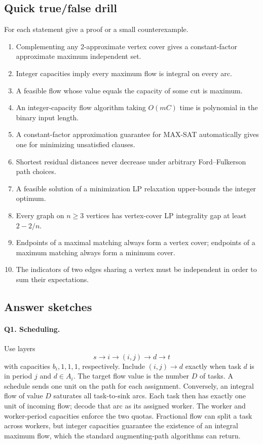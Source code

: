 \subsection{Quick true/false drill}
For each statement give a proof or a small counterexample.
\begin{enumerate}[label=\textbf{T\arabic*.}]
  \item Complementing any 2-approximate vertex cover gives a constant-factor
        approximate maximum independent set.
  \item Integer capacities imply every maximum flow is integral on every arc.
  \item A feasible flow whose value equals the capacity of some cut is maximum.
  \item An integer-capacity flow algorithm taking $O(mC)$ time is polynomial
        in the binary input length.
  \item A constant-factor approximation guarantee for MAX-SAT automatically
        gives one for minimizing unsatisfied clauses.
  \item Shortest residual distances never decrease under arbitrary
        Ford--Fulkerson path choices.
  \item A feasible solution of a minimization LP relaxation upper-bounds
        the integer optimum.
  \item Every graph on $n\ge3$ vertices has vertex-cover LP integrality gap
        at least $2-2/n$.
  \item Endpoints of a maximal matching always form a vertex cover;
        endpoints of a maximum matching always form a minimum cover.
  \item The indicators of two edges sharing a vertex must be independent
        in order to sum their expectations.
\end{enumerate}

\clearpage
\subsection{Answer sketches}
\paragraph{Q1. Scheduling.}
Use layers
\[
s\longrightarrow i\longrightarrow(i,j)\longrightarrow d\longrightarrow t
\]
with capacities $b_i,1,1,1$, respectively.  Include $(i,j)\to d$ exactly
when task $d$ is in period $j$ and $d\in A_i$.  The target flow value is
the number $D$ of tasks.  A schedule sends one unit on the path for each
assignment.  Conversely, an integral flow of value $D$ saturates all
task-to-sink arcs.  Each task then has exactly one unit of incoming flow;
decode that arc as its assigned worker.  The worker and worker-period
capacities enforce the two quotas.  Fractional flow can split a task across
workers, but integer capacities guarantee the existence of an integral
maximum flow, which the standard augmenting-path algorithms can return.

